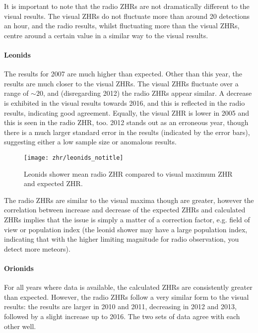 It is important to note that the radio ZHRs are not dramatically different to
the visual results. The visual ZHRs do not fluctuate more than around 20
detections an hour, and the radio results, whilst fluctuating more than the
visual ZHRs, centre around a certain value in a similar way to the visual
results.

\paragraph{Leonids\\}

The results for 2007 are much higher than expected. Other than this year, the
results are much closer to the visual ZHRs.  The visual ZHRs fluctuate over a
range of ${\sim}20$, and (disregarding 2012) the radio ZHRs appear similar. A
decrease is exhibited in the visual results towards 2016, and this is reflected
in the radio results, indicating good agreement. Equally, the visual ZHR is
lower in 2005 and this is seen in the radio ZHR, too. 2012 stands out as an
erroneous year, though there is a much larger standard error in the results
(indicated by the error bars), suggesting either a low sample size or anomalous
results.

\begin{figure}[h!] 
	\centering
	\texttt{[image: zhr/leonids\_notitle]} 
	\caption{Leonids shower mean radio ZHR compared to visual maximum ZHR and
	expected ZHR.}
	\label{fig:zhr:leo}	
\end{figure}

The radio ZHRs are similar to the visual maxima though are greater, however the
correlation between increase and decrease of the expected ZHRs and calculated
ZHRs implies that the issue is simply a matter of a correction factor, e.g.
field of view or population index (the leonid shower may have a large population
index, indicating that with the higher limiting magnitude for radio observation,
you detect more meteors).

\paragraph{Orionids\\}

For all years where data is available, the calculated ZHRs are consistently
greater than expected. However, the radio ZHRs follow a very similar form to the
visual results: the results are larger in 2010 and 2011, decreasing in 2012 and
2013, followed by a slight increase up to 2016. The two sets of data agree with
each other well.

